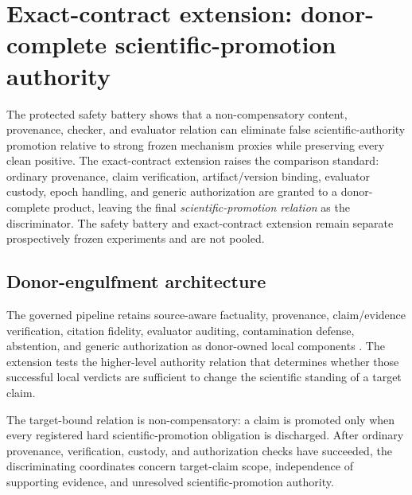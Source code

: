 \section{Exact-contract extension: donor-complete scientific-promotion authority}
\label{sec:exact-contract-extension}

The protected safety battery shows that a non-compensatory content, provenance, checker, and evaluator relation can eliminate false scientific-authority promotion relative to strong frozen mechanism proxies while preserving every clean positive. The exact-contract extension raises the comparison standard: ordinary provenance, claim verification, artifact/version binding, evaluator custody, epoch handling, and generic authorization are granted to a donor-complete product, leaving the final \emph{scientific-promotion relation} as the discriminator. The safety battery and exact-contract extension remain separate prospectively frozen experiments and are not pooled.

\subsection{Donor-engulfment architecture}
The governed pipeline retains source-aware factuality, provenance, claim/evidence verification, citation fidelity, evaluator auditing, contamination defense, abstention, and generic authorization as donor-owned local components \citep{provenanceguard2026,provenai2026,provsen2026,benchguard2026,certifiedspeculative2026}. The extension tests the higher-level authority relation that determines whether those successful local verdicts are sufficient to change the scientific standing of a target claim.

The target-bound relation is non-compensatory: a claim is promoted only when every registered hard scientific-promotion obligation is discharged. After ordinary provenance, verification, custody, and authorization checks have succeeded, the discriminating coordinates concern target-claim scope, independence of supporting evidence, and unresolved scientific-promotion authority.

